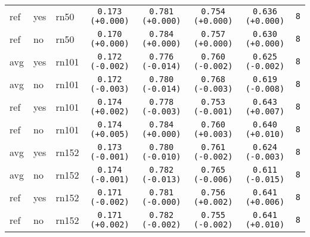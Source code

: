 \begin{tabular}{|l|l|l|c|c|c|c|c|}
\rowcolor{verylightgray}ref & yes & rn50 & \texttt{0.173 {\color{black}(+0.000)}} & \texttt{0.781 {\color{black}(+0.000)}} & \texttt{0.754 {\color{black}(+0.000)}} & \texttt{0.636 {\color{black}(+0.000)}} & \texttt{8} \\
\rowcolor{verylightgray}ref & no & rn50 & \texttt{0.170 {\color{black}(+0.000)}} & \texttt{0.784 {\color{black}(+0.000)}} & \texttt{0.757 {\color{black}(+0.000)}} & \texttt{0.630 {\color{black}(+0.000)}} & \texttt{8} \\
\hline
avg & yes & rn101 & \texttt{0.172 {\color{red}(-0.002)}} & \texttt{0.776 {\color{green}(-0.014)}} & \texttt{0.760 {\color{green}(-0.002)}} & \texttt{0.625 {\color{red}(-0.002)}} & \texttt{8} \\
avg & no & rn101 & \texttt{0.172 {\color{red}(-0.003)}} & \texttt{0.780 {\color{green}(-0.014)}} & \texttt{0.768 {\color{green}(-0.003)}} & \texttt{0.619 {\color{red}(-0.008)}} & \texttt{8} \\
ref & yes & rn101 & \texttt{0.174 {\color{green}(+0.002)}} & \texttt{0.778 {\color{green}(-0.003)}} & \texttt{0.753 {\color{green}(-0.001)}} & \texttt{0.643 {\color{green}(+0.007)}} & \texttt{8} \\
ref & no & rn101 & \texttt{0.174 {\color{green}(+0.005)}} & \texttt{0.784 {\color{black}(+0.000)}} & \texttt{0.760 {\color{red}(+0.003)}} & \texttt{0.640 {\color{green}(+0.010)}} & \texttt{8} \\
\hline
avg & yes & rn152 & \texttt{0.173 {\color{red}(-0.001)}} & \texttt{0.780 {\color{green}(-0.010)}} & \texttt{0.761 {\color{green}(-0.002)}} & \texttt{0.624 {\color{red}(-0.003)}} & \texttt{8} \\
avg & no & rn152 & \texttt{0.174 {\color{red}(-0.001)}} & \texttt{0.782 {\color{green}(-0.013)}} & \texttt{0.765 {\color{green}(-0.006)}} & \texttt{0.611 {\color{red}(-0.015)}} & \texttt{8} \\
ref & yes & rn152 & \texttt{0.171 {\color{red}(-0.002)}} & \texttt{0.781 {\color{black}(-0.000)}} & \texttt{0.756 {\color{red}(+0.002)}} & \texttt{0.641 {\color{green}(+0.006)}} & \texttt{8} \\
ref & no & rn152 & \texttt{0.171 {\color{green}(+0.002)}} & \texttt{0.782 {\color{green}(-0.002)}} & \texttt{0.755 {\color{green}(-0.002)}} & \texttt{0.641 {\color{green}(+0.010)}} & \texttt{8} \\
\hline
\end{tabular}

